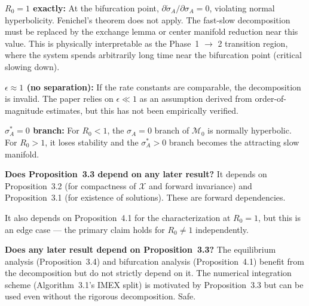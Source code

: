 \begin{boundary-case}
\textbf{$R_0 = 1$ exactly:} At the bifurcation point, $\partial \dot{\sigma}_A / \partial \sigma_A = 0$,
violating normal hyperbolicity. Fenichel's theorem does not apply.
The fast-slow decomposition must be replaced by the exchange lemma or
center manifold reduction near this value. This is physically
interpretable as the Phase~1 $\to$ 2 transition region, where the
system spends arbitrarily long time near the bifurcation point
(critical slowing down).

\textbf{$\epsilon \approx 1$ (no separation):} If the rate constants
are comparable, the decomposition is invalid. The paper relies on
$\epsilon \ll 1$ as an assumption derived from order-of-magnitude
estimates, but this has not been empirically verified.

\textbf{$\sigma_A^* = 0$ branch:} For $R_0 < 1$, the $\sigma_A = 0$
branch of $\mathcal{M}_0$ is normally hyperbolic. For $R_0 > 1$,
it loses stability and the $\sigma_A^* > 0$ branch becomes the
attracting slow manifold.
\end{boundary-case}

\begin{circularity-check}
\textbf{Does Proposition~3.3 depend on any later result?}
It depends on Proposition~3.2 (for compactness of $\mathcal{X}$ and
forward invariance) and Proposition~3.1 (for existence of solutions).
These are forward dependencies.

It also depends on Proposition~4.1 for the characterization at
$R_0 = 1$, but this is an edge case --- the primary claim holds for
$R_0 \neq 1$ independently.

\textbf{Does any later result depend on Proposition~3.3?}
The equilibrium analysis (Proposition~3.4) and bifurcation analysis
(Proposition~4.1) benefit from the decomposition but do not strictly
depend on it. The numerical integration scheme (Algorithm~3.1's IMEX
split) is motivated by Proposition~3.3 but can be used even without
the rigorous decomposition. Safe.
\end{circularity-check}
